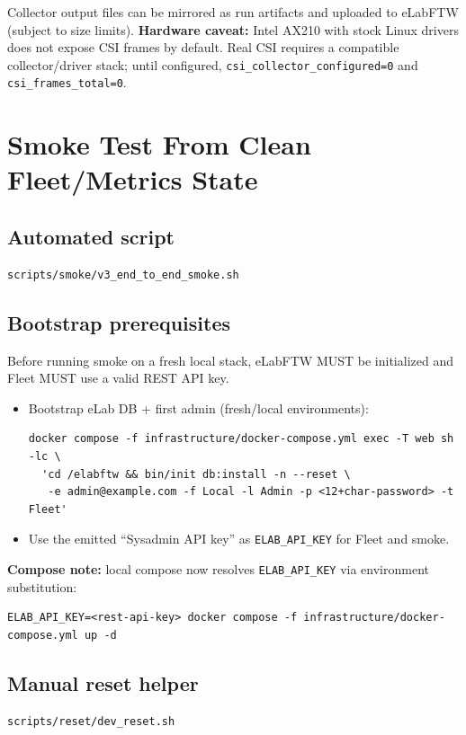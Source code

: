 \documentclass[11pt,a4paper]{article}
\begin{document}
Collector output files can be mirrored as run artifacts and uploaded to eLabFTW (subject to size limits).
\textbf{Hardware caveat:} Intel AX210 with stock Linux drivers does not expose CSI frames by default. Real CSI requires a compatible collector/driver stack; until configured, \texttt{csi\_collector\_configured=0} and \texttt{csi\_frames\_total=0}.

\section{Smoke Test From Clean Fleet/Metrics State}
\subsection{Automated script}
\begin{verbatim}
scripts/smoke/v3_end_to_end_smoke.sh
\end{verbatim}

\subsection{Bootstrap prerequisites}
Before running smoke on a fresh local stack, eLabFTW MUST be initialized and Fleet MUST use a valid REST API key.
\begin{itemize}
  \item Bootstrap eLab DB + first admin (fresh/local environments):
\begin{verbatim}
docker compose -f infrastructure/docker-compose.yml exec -T web sh -lc \
  'cd /elabftw && bin/init db:install -n --reset \
   -e admin@example.com -f Local -l Admin -p <12+char-password> -t Fleet'
\end{verbatim}
  \item Use the emitted ``Sysadmin API key'' as \texttt{ELAB\_API\_KEY} for Fleet and smoke.
\end{itemize}

\textbf{Compose note:} local compose now resolves \texttt{ELAB\_API\_KEY} via environment substitution:
\begin{verbatim}
ELAB_API_KEY=<rest-api-key> docker compose -f infrastructure/docker-compose.yml up -d
\end{verbatim}

\subsection{Manual reset helper}
\begin{verbatim}
scripts/reset/dev_reset.sh
\end{verbatim}
\end{document}
